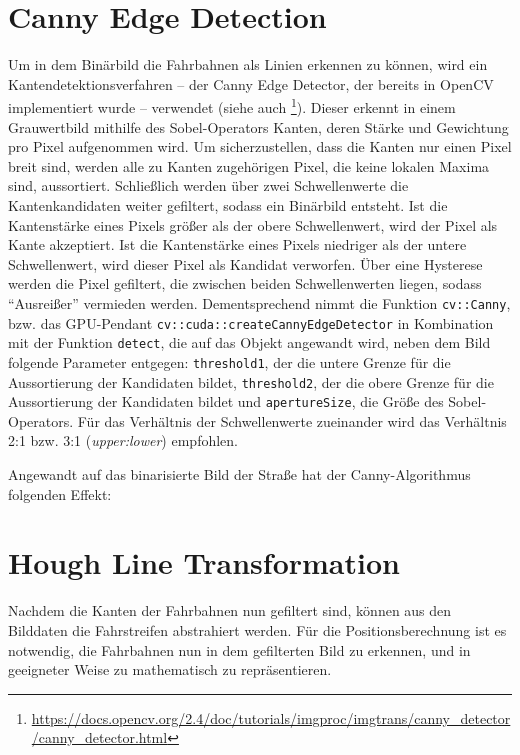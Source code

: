 \documentclass[a4paper,12pt]{report}
\begin{document}
\section{Canny Edge Detection} %
	Um in dem Binärbild die Fahrbahnen als Linien erkennen zu können, wird ein Kantendetektionsverfahren -- der Canny Edge Detector, der bereits in OpenCV implementiert wurde -- verwendet (siehe auch \footnote{\url{https://docs.opencv.org/2.4/doc/tutorials/imgproc/imgtrans/canny\_detector/canny\_detector.html}}). Dieser erkennt in einem Grauwertbild mithilfe des Sobel-Operators Kanten, deren Stärke und Gewichtung pro Pixel aufgenommen wird. Um sicherzustellen, dass die Kanten nur einen Pixel breit sind, werden alle zu Kanten zugehörigen Pixel, die keine lokalen Maxima sind, aussortiert. Schließlich werden über zwei Schwellenwerte die Kantenkandidaten weiter gefiltert, sodass ein Binärbild entsteht. Ist die Kantenstärke eines Pixels größer als der obere Schwellenwert, wird der Pixel als Kante akzeptiert. Ist die Kantenstärke eines Pixels niedriger als der untere Schwellenwert, wird dieser Pixel als Kandidat verworfen. Über eine Hysterese werden die Pixel gefiltert, die zwischen beiden Schwellenwerten liegen, sodass "`Ausreißer"' vermieden werden. Dementsprechend nimmt die Funktion \texttt{cv::Canny}, bzw. das GPU-Pendant \texttt{cv::cuda::createCannyEdgeDetector} in Kombination mit der Funktion \texttt{detect}, die auf das Objekt angewandt wird, neben dem Bild folgende Parameter entgegen: \texttt{threshold1}, der die untere Grenze für die Aussortierung der Kandidaten bildet, \texttt{threshold2}, der die obere Grenze für die Aussortierung der Kandidaten bildet und \texttt{apertureSize}, die Größe des Sobel-Operators. Für das Verhältnis der Schwellenwerte zueinander wird das Verhältnis 2:1 bzw. 3:1 (\textit{upper:lower}) empfohlen.

	Angewandt auf das binarisierte Bild der Straße hat der Canny-Algorithmus folgenden Effekt:


\section{Hough Line Transformation}
	Nachdem die Kanten der Fahrbahnen nun gefiltert sind, können aus den Bilddaten die Fahrstreifen abstrahiert werden. Für die Positionsberechnung ist es notwendig, die Fahrbahnen nun in dem gefilterten Bild zu erkennen, und in geeigneter Weise zu mathematisch zu repräsentieren.
\end{document}
